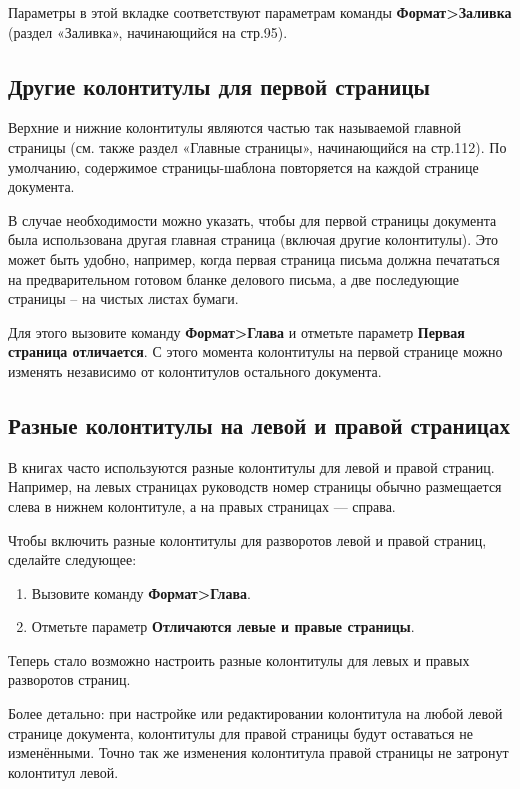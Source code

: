 \documentclass[a4paper,10pt]{article}
\begin{document}
Параметры в этой вкладке соответствуют параметрам команды \textbf{Формат>Заливка} (раздел «Заливка», начинающийся на стр.95).

\subsection{Другие колонтитулы для первой страницы}
Верхние и нижние колонтитулы являются частью так называемой главной страницы (см. также раздел «Главные страницы», начинающийся на стр.112). По умолчанию, содержимое страницы-шаблона повторяется на каждой странице документа.

В случае необходимости можно указать, чтобы для первой страницы документа была использована другая главная страница (включая другие колонтитулы). Это может быть удобно, например, когда первая страница письма должна печататься на предварительном готовом бланке делового письма, а две последующие страницы -- на чистых листах бумаги.

Для этого вызовите команду \textbf{Формат>Глава} и отметьте параметр \textbf{Первая страница отличается}. С этого момента колонтитулы на первой странице можно изменять независимо от колонтитулов остального документа.

\subsection{Разные колонтитулы на левой и правой страницах}
В книгах часто используются разные колонтитулы для левой и правой страниц. Например, на левых страницах руководств номер страницы обычно размещается слева в нижнем колонтитуле, а на правых страницах --- справа.

Чтобы включить разные колонтитулы для разворотов левой и правой страниц, сделайте следующее:

\begin{enumerate}
 \item Вызовите команду \textbf{Формат>Глава}.
 \item Отметьте параметр \textbf{Отличаются левые и правые страницы}.
\end{enumerate}

Теперь стало возможно настроить разные колонтитулы для левых и правых разворотов страниц.

Более детально: при настройке или редактировании колонтитула на любой левой странице документа, колонтитулы для правой страницы будут оставаться не изменёнными. Точно так же изменения колонтитула правой страницы не затронут колонтитул левой.
\end{document}
